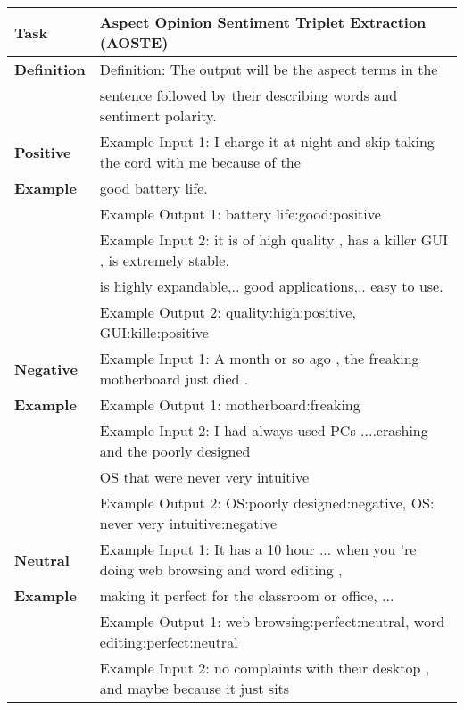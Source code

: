 \documentclass[11pt]{article}
\begin{document}
\begin{table*}[]
\resizebox{\linewidth}{!}
{
\begin{tabular}{ll}
\hline
\textbf{Task} & Aspect Opinion Sentiment Triplet Extraction (AOSTE) \\ 
\hline                                                  
\textbf{Definition} & Definition: The output will be the aspect terms in the \\
& sentence followed by their describing words and sentiment polarity.\\ 
\hline                                          
\textbf{Positive}   & Example Input 1: I charge it at night and skip taking the cord with me because of the \\ 
\textbf{Example}    &  good battery life.       \\
\textbf{}           & Example Output 1: battery life:good:positive   \\
\textbf{}           & Example Input 2: it is of high quality , has a killer GUI , is extremely stable,\\
\textbf{}           &is highly expandable,.. good applications,.. easy to use.\\
\textbf{}           & Example Output 2: quality:high:positive, GUI:kille:positive \\ 
\hline                             
\textbf{Negative}   & Example Input 1: A month or so ago , the freaking motherboard just died . \\
\textbf{Example}    & Example Output 1: motherboard:freaking \\
\textbf{}           & Example Input 2: I had always used PCs ....crashing and the poorly designed \\
\textbf{}           & OS that were never very intuitive               \\
\textbf{}           & Example Output 2: OS:poorly designed:negative, OS: never very intuitive:negative  \\ 
\hline  
\textbf{Neutral}    & Example Input 1: It has a 10 hour ... when you 're doing web browsing and word editing ,\\
\textbf{Example}    & making it perfect for the classroom or office, ...          \\
\textbf{}           & Example Output 1: web browsing:perfect:neutral, word editing:perfect:neutral \\        
\textbf{}           & Example Input 2: no complaints with their desktop , and maybe because it just sits \\ 

\end{tabular}}
\end{table*}
\end{document}
